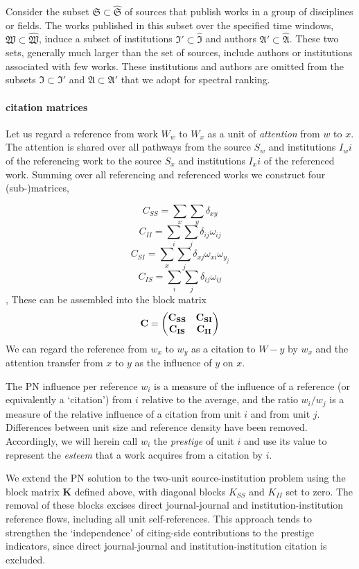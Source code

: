 \documentclass[10pt]{article}
\begin{document}
Consider the subset $\mathfrak{S} \subset \mathfrak{\hat{S}}$ of sources that publish works in a group of disciplines or fields. The works published in this subset over the specified time windows, $\mathfrak{W} \subset \mathfrak{\hat{W}}$, induce a subset of institutions $\mathfrak{I'} \subset \mathfrak{\hat{I}}$ and authors $\mathfrak{A'} \subset \mathfrak{\hat{A}}$. These two sets, generally much larger than the set of sources, include authors or institutions associated with few works. These institutions and authors are omitted from the subsets $\mathfrak{I} \subset \mathfrak{I'}$ and $\mathfrak{A} \subset \mathfrak{A'}$ that we adopt for spectral ranking. 

\paragraph{citation matrices}
Let us regard a reference from work $W_w$ to $W_x$ as a unit of \textit{attention} from $w$ to $x$. The attention is shared over all pathways from the source $S_w$ and institutions $I_wi$ of the referencing work to the source $S_x$ and institutions $I_xi$ of the referenced work. Summing over all referencing and referenced works we construct four (sub-)matrices,

\[ C_{SS} = \sum_x \sum_y \delta_{xy}\]
\[ C_{II} = \sum_i \sum_j \delta_{ij} \omega_{ij} \]
\[ C_{SI} = \sum_x \sum_j \delta_{xj} \omega_{xi} \omega_{y_j}\]
\[ C_{IS} = \sum_i \sum_j \delta_{ij} \omega_{ij} \],
These can be assembled into the block matrix
\[\bf{C} = 
\begin{pmatrix}
	\bf{C_{SS}} & \bf{C_{SI}} \\
	\bf{C_{IS}} & \bf{C_{II}}
\end{pmatrix}
\]
We can regard the reference from $w_x$ to $w_y$ as a citation to $W-y$ by $w_x$ and the attention transfer from $x$ to $y$ as the influence of $y$ on $x$.   

The PN influence per reference $w_i$ is a measure of the influence of a reference (or equivalently a `citation') from $i$ relative to the average, and the ratio $w_i/w_j$ is a measure of the relative influence of a citation from unit $i$ and from unit $j$. Differences between unit size and reference density have been removed. Accordingly, we will herein call $w_i$ the \textit{prestige} of unit $i$ and use its value to represent the \textit{esteem} that a work acquires from a citation by $i$. 

We extend the PN solution to the two-unit source-institution problem using the block matrix $\mathbf{K}$ defined above, with diagonal blocks $K_{SS}$ and $K_{II}$ set to zero. The removal of these blocks excises direct journal-journal and institution-institution reference flows, including all unit self-references. This approach tends to strengthen the `independence' of citing-side contributions to the prestige indicators, since direct journal-journal and institution-institution citation is excluded. 
\end{document}
